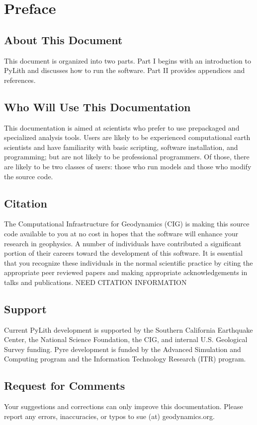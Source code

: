 \chapter{Preface}

\section{About This Document}

This document is organized into two parts. Part I begins with an
introduction to PyLith and discusses how to run the software. Part II
provides appendices and references.

\section{Who Will Use This Documentation}

This documentation is aimed at scientists who prefer to use
prepackaged and specialized analysis tools. Users are likely to be
experienced computational earth scientists and have familiarity with
basic scripting, software installation, and programming; but are not
likely to be professional programmers. Of those, there are likely to
be two classes of users: those who run models and those who modify the
source code.

\section{Citation}

The Computational Infrastructure for Geodynamics (CIG) is making this
source code available to you at no cost in hopes that the software
will enhance your research in geophysics. A number of individuals have
contributed a significant portion of their careers toward the
development of this software. It is essential that you recognize these
individuals in the normal scientific practice by citing the
appropriate peer reviewed papers and making appropriate
acknowledgements in talks and publications. NEED CITATION INFORMATION

\section{Support}

Current PyLith development is supported by the Southern California
Earthquake Center, the National Science Foundation, the CIG, and
internal U.S. Geological Survey funding. Pyre development is funded by
the  Advanced Simulation
and Computing program and the  Information Technology Research
(ITR) program.

\section{Request for Comments}

Your suggestions and corrections can only improve this documentation.
Please report any errors, inaccuracies, or typos to sue (at)
geodynamics.org.
